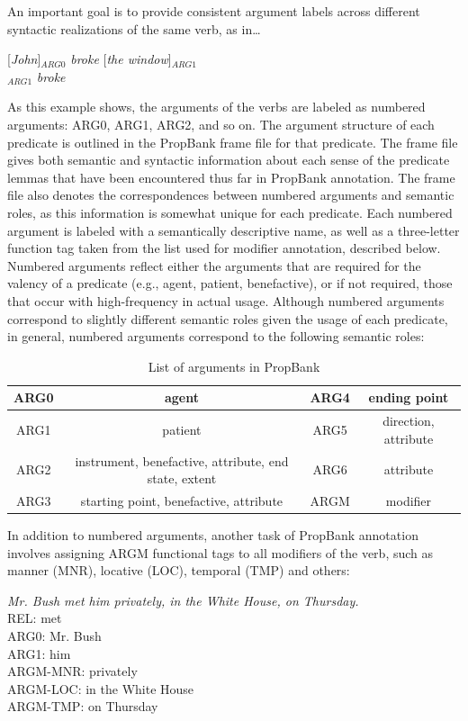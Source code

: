 \documentclass[11pt]{report}
\begin{document}
\noindent An important goal is to provide consistent argument labels across different syntactic realizations of the same verb, as in\ldots

[\textit{John}]$_{ARG0}$ \textit{broke} [\textit{the window}]$_{ARG1}$ \\ $_{ARG1}$ \textit{broke}

\noindent As this example shows, the arguments of the verbs are labeled as numbered arguments: ARG0, ARG1, ARG2, and so on.  The argument structure of each predicate is outlined in the PropBank frame file for that predicate.  The frame file gives both semantic and syntactic information about each sense of the predicate lemmas that have been encountered thus far in PropBank annotation.  The frame file also denotes the correspondences between numbered arguments and semantic roles, as this information is somewhat unique for each predicate. Each numbered argument is labeled with a semantically descriptive name, as well as a three-letter function tag taken from the list used for modifier annotation, described below. Numbered arguments reflect either the arguments that are required for the valency of a predicate (e.g., agent, patient, benefactive), or if not required, those that occur with high-frequency in actual usage.  Although numbered arguments correspond to slightly different semantic roles given the usage of each predicate, in general, numbered arguments correspond to the following semantic roles: 

\begin{table}[htp]
\centering
\begin{tabular}{|c|c||c|c|}
\hline ARG0 & agent   & ARG4 & ending point\\
\hline ARG1 & patient & ARG5 & direction, attribute\\
\hline ARG2 & instrument, benefactive, attribute, end state, extent & ARG6 & attribute\\
\hline ARG3 & starting point, benefactive, attribute   & ARGM & modifier\\
\hline 
\end{tabular}
\caption{List of arguments in PropBank}
\label{tbl:arguments}
\end{table}

\noindent In addition to numbered arguments, another task of PropBank annotation involves assigning ARGM functional tags to all modifiers of the verb, such as manner (MNR), locative (LOC), temporal (TMP) and others:

\textit{Mr. Bush met him privately, in the White House, on Thursday.} \\
REL:  met \\
ARG0: Mr. Bush \\ 
ARG1: him \\
ARGM-MNR: privately \\
ARGM-LOC: in the White House \\
ARGM-TMP: on Thursday
\end{document}
